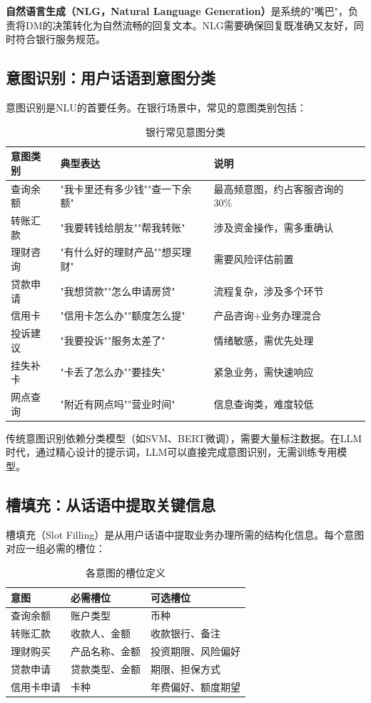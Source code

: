 \textbf{自然语言生成（NLG，Natural Language Generation）}是系统的"嘴巴"，负责将DM的决策转化为自然流畅的回复文本。NLG需要确保回复既准确又友好，同时符合银行服务规范。

\subsection{意图识别：用户话语到意图分类}

意图识别是NLU的首要任务。在银行场景中，常见的意图类别包括：

\begin{table}[H]
\centering
\begin{tabular}{llp{7cm}}
\toprule
\textbf{意图类别} & \textbf{典型表达} & \textbf{说明} \\
\midrule
查询余额 & "我卡里还有多少钱""查一下余额" & 最高频意图，约占客服咨询的30\% \\
转账汇款 & "我要转钱给朋友""帮我转账" & 涉及资金操作，需多重确认 \\
理财咨询 & "有什么好的理财产品""想买理财" & 需要风险评估前置 \\
贷款申请 & "我想贷款""怎么申请房贷" & 流程复杂，涉及多个环节 \\
信用卡 & "信用卡怎么办""额度怎么提" & 产品咨询+业务办理混合 \\
投诉建议 & "我要投诉""服务太差了" & 情绪敏感，需优先处理 \\
挂失补卡 & "卡丢了怎么办""要挂失" & 紧急业务，需快速响应 \\
网点查询 & "附近有网点吗""营业时间" & 信息查询类，难度较低 \\
\bottomrule
\end{tabular}
\caption{银行常见意图分类}
\end{table}

传统意图识别依赖分类模型（如SVM、BERT微调），需要大量标注数据。在LLM时代，通过精心设计的提示词，LLM可以直接完成意图识别，无需训练专用模型。

\subsection{槽填充：从话语中提取关键信息}

槽填充（Slot Filling）是从用户话语中提取业务办理所需的结构化信息。每个意图对应一组必需的槽位：

\begin{table}[H]
\centering
\begin{tabular}{lll}
\toprule
\textbf{意图} & \textbf{必需槽位} & \textbf{可选槽位} \\
\midrule
查询余额 & 账户类型 & 币种 \\
转账汇款 & 收款人、金额 & 收款银行、备注 \\
理财购买 & 产品名称、金额 & 投资期限、风险偏好 \\
贷款申请 & 贷款类型、金额 & 期限、担保方式 \\
信用卡申请 & 卡种 & 年费偏好、额度期望 \\
\bottomrule
\end{tabular}
\caption{各意图的槽位定义}
\end{table}

